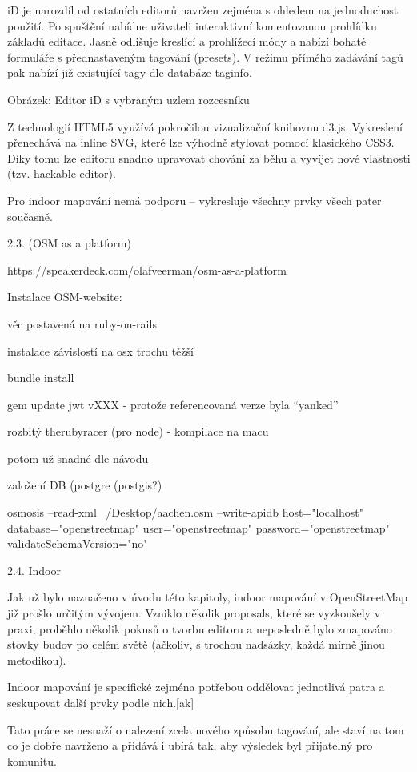 iD je narozdíl od ostatních editorů navržen zejména s ohledem na jednoduchost použití. Po spuštění nabídne uživateli interaktivní komentovanou prohlídku základů editace. Jasně odlišuje kreslící a prohlížecí módy a nabízí bohaté formuláře s přednastaveným tagování (presets). V režimu přímého zadávání tagů pak nabízí již existující tagy dle databáze taginfo.



Obrázek: Editor iD s vybraným uzlem rozcesníku

Z technologií HTML5 využívá pokročilou vizualizační knihovnu d3.js. Vykreslení přenechává na inline SVG, které lze výhodně stylovat pomocí klasického CSS3. Díky tomu lze editoru snadno upravovat chování za běhu a vyvíjet nové vlastnosti (tzv. hackable editor).

Pro indoor mapování nemá podporu – vykresluje všechny prvky všech pater současně.

2.3. (OSM as a platform)



https://speakerdeck.com/olafveerman/osm-as-a-platform

Instalace OSM-website:

věc postavená na ruby-on-rails

instalace závislostí na osx trochu těžší

bundle install

gem update jwt vXXX - protože referencovaná verze byla “yanked”

rozbitý therubyracer (pro node) - kompilace na macu

potom už snadné dle návodu 

založení DB (postgre (postgis?)

osmosis --read-xml ~/Desktop/aachen.osm --write-apidb host="localhost" database="openstreetmap" user="openstreetmap" password="openstreetmap" validateSchemaVersion="no"

2.4. Indoor



Jak už bylo naznačeno v úvodu této kapitoly, indoor mapování v OpenStreetMap již prošlo určitým vývojem. Vzniklo několik proposals, které se vyzkoušely v praxi, proběhlo několik pokusů o tvorbu editoru a neposledně bylo zmapováno stovky budov po celém světě (ačkoliv, s trochou nadsázky, každá mírně jinou metodikou).

Indoor mapování je specifické zejména potřebou oddělovat jednotlivá patra a seskupovat další prvky podle nich.[ak]

Tato práce se nesnaží o nalezení zcela nového způsobu tagování, ale staví na tom co je dobře navrženo a přidává i ubírá tak, aby výsledek byl přijatelný pro komunitu.


